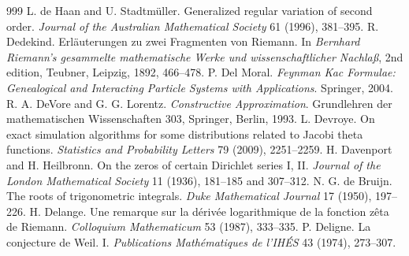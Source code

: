 \begin{thebibliography}{999}
 L. de Haan and U. Stadtm\"uller. Generalized regular variation of second order. \emph{Journal of the Australian Mathematical Society} 61 (1996), 381--395.
 R. Dedekind. Erl\"auterungen zu zwei Fragmenten von Riemann. In \emph{Bernhard Riemann's gesammelte mathematische Werke und wissenschaftlicher Nachla{\ss}}, 2nd edition, Teubner, Leipzig, 1892, 466--478.
 P. Del Moral. \emph{Feynman Kac Formulae: Genealogical and Interacting Particle Systems with Applications}. Springer, 2004.
 R. A. DeVore and G. G. Lorentz. \emph{Constructive Approximation}. Grundlehren der mathematischen Wissenschaften 303, Springer, Berlin, 1993. %
 L. Devroye. On exact simulation algorithms for some distributions related to Jacobi theta functions. \emph{Statistics and Probability Letters} 79 (2009), 2251--2259.
 H. Davenport and H. Heilbronn. On the zeros of certain Dirichlet series I, II. \emph{Journal of the London Mathematical Society} 11 (1936), 181--185 and 307--312.
 N. G. de Bruijn. The roots of trigonometric integrals. \emph{Duke Mathematical Journal} 17 (1950), 197--226.
 H. Delange. Une remarque sur la d\'eriv\'ee logarithmique de la fonction z\^eta de Riemann. \emph{Colloquium Mathematicum} 53 (1987), 333--335.
 P. Deligne. La conjecture de Weil. I. \emph{Publications Math\'ematiques de l'IH\'ES} 43 (1974), 273--307.

\end{thebibliography}
